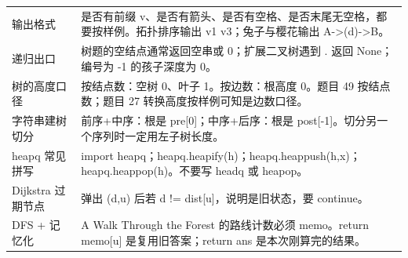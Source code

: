 \documentclass[10pt,a4paper,fontset=none]{ctexart}
\begin{document}
\begin{longtable}{p{}p{}}
输出格式 & 是否有前缀 v、是否有箭头、是否有空格、是否末尾无空格，都要按样例。拓扑排序输出 v1 v3；兔子与樱花输出 A->(d)->B。\\
递归出口 & 树题的空结点通常返回空串或 0；扩展二叉树遇到 . 返回 None；编号为 -1 的孩子深度为 0。\\
树的高度口径 & 按结点数：空树 0、叶子 1。按边数：根高度 0。题目 49 按结点数；题目 27 转换高度按样例可知是边数口径。\\
字符串建树切分 & 前序+中序：根是 pre[0]；中序+后序：根是 post[-1]。切分另一个序列时一定用左子树长度。\\
heapq 常见拼写 & import heapq；heapq.heapify(h)；heapq.heappush(h,x)；heapq.heappop(h)。不要写 headq 或 heapop。\\
Dijkstra 过期节点 & 弹出 (d,u) 后若 d != dist[u]，说明是旧状态，要 continue。\\
DFS + 记忆化 & A Walk Through the Forest 的路线计数必须 memo。return memo[u] 是复用旧答案；return ans 是本次刚算完的结果。\\
\bottomrule
\end{longtable}
\end{document}
